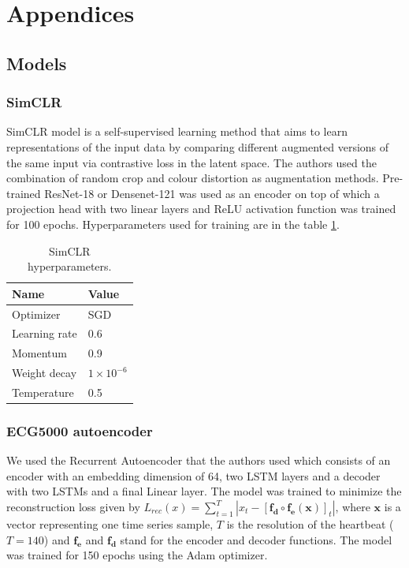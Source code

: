 \newpage
\appendix
\section{Appendices}


\subsection{Models}
\label{appendix:models}

\subsubsection{SimCLR}
SimCLR model \cite{simclrref} is a self-supervised learning method that aims to learn representations of the input data by comparing different augmented versions of the same input via contrastive loss in the latent space. The authors used the combination of random crop and colour distortion as augmentation methods. Pre-trained ResNet-18 \cite{resnetref} or Densenet-121 \cite{densenet} was used as an encoder on top of which a projection head with two linear layers and ReLU activation function was trained for 100 epochs. Hyperparameters used for training are in the table \ref{table:SimCLR hyperparemeters}.

\begin{table}[H]
    \centering
    \begin{tabular}{ll}
    \hline
                    Name & Value   \\
    \hline
     Optimizer & SGD\\
     Learning rate & 0.6\\
     Momentum   & 0.9\\
     Weight decay & $1\times10^{-6}$\\
     Temperature & 0.5\\
    \hline
    \end{tabular}
\caption{SimCLR hyperparameters.}
\label{table:SimCLR hyperparemeters}
\end{table}

\subsubsection{ECG5000 autoencoder}
We used the Recurrent Autoencoder that the authors used which consists of an encoder with an embedding dimension of 64, two LSTM layers and a decoder with two LSTMs and a final Linear layer. The model was trained to minimize the reconstruction loss given by \begin{math}L_{rec}(x)=\sum_{t=1}^{T}\left | x_{t}-\left [ \mathbf{f_{d}} \circ \mathbf{f_{e}(x)}\right ]_{t} \right | \end{math}, where $\mathbf{x}$ is a vector representing one time series sample, $T$ is the resolution of the heartbeat ($T=140$) and $\mathbf{f_{e}}$ and $\mathbf{f_{d}}$ stand for the encoder and decoder functions. The model was trained for 150 epochs using the Adam optimizer.
\\

